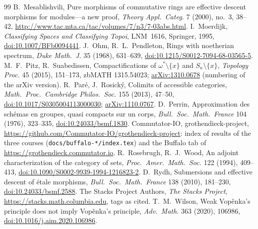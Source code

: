 \documentclass[11pt,a4paper]{amsart}
\theoremstyle{definition}
\theoremstyle{remark}
\begin{document}
\begin{thebibliography}{99}
 B.~Mesablishvili, Pure morphisms of commutative rings are effective descent morphisms for modules---a new proof, \emph{Theory Appl.\ Categ.} 7 (2000), no.~3, 38--42, \url{http://www.tac.mta.ca/tac/volumes/7/n3/7-03abs.html}.
 I.~Moerdijk, \emph{Classifying Spaces and Classifying Topoi}, LNM~1616, Springer, 1995, \href{https://doi.org/10.1007/BFb0094441}{doi:10.1007/BFb0094441}.
 J.~Ohm, R.~L.~Pendleton, Rings with noetherian spectrum, \emph{Duke Math.\ J.} 35 (1968), 631--639, \href{https://doi.org/10.1215/S0012-7094-68-03565-5}{doi:10.1215/S0012-7094-68-03565-5}.
 M.~F.~Pitz, R.~Suabedissen, Compactifications of $\omega^*\setminus\{x\}$ and $S_\kappa\setminus\{x\}$, \emph{Topology Proc.} 45 (2015), 151--173, zbMATH 1315.54023; \href{https://arxiv.org/abs/1310.0678}{arXiv:1310.0678} (numbering of the arXiv version).
 R.~Paré, J.~Rosický, Colimits of accessible categories, \emph{Math.\ Proc.\ Cambridge Philos.\ Soc.} 155 (2013), 47--50, \href{https://doi.org/10.1017/S0305004113000030}{doi:10.1017/S0305004113000030}; \href{https://arxiv.org/abs/1110.0767}{arXiv:1110.0767}.
 D.~Perrin, Approximation des schémas en groupes, quasi compacts sur un corps, \emph{Bull.\ Soc.\ Math.\ France} 104 (1976), 323--335, \href{https://doi.org/10.24033/bsmf.1830}{doi:10.24033/bsmf.1830}.
 Commutator-IO, grothendieck-project, \url{https://github.com/Commutator-IO/grothendieck-project}: index of results of the three courses (\texttt{docs/buffalo-*/index.tex}) and the Buffalo tab of \url{https://grothendieck.commutator.io}.
 R.~Rosebrugh, R.~J.~Wood, An adjoint characterization of the category of sets, \emph{Proc.\ Amer.\ Math.\ Soc.} 122 (1994), 409--413, \href{https://doi.org/10.1090/S0002-9939-1994-1216823-2}{doi:10.1090/S0002-9939-1994-1216823-2}.
 D.~Rydh, Submersions and effective descent of étale morphisms, \emph{Bull.\ Soc.\ Math.\ France} 138 (2010), 181--230, \href{https://doi.org/10.24033/bsmf.2588}{doi:10.24033/bsmf.2588}.
 The Stacks Project Authors, \emph{The Stacks Project}, \url{https://stacks.math.columbia.edu}, tags as cited.
 T.~M.~Wilson, Weak Vop\v{e}nka's principle does not imply Vop\v{e}nka's principle, \emph{Adv.\ Math.} 363 (2020), 106986, \href{https://doi.org/10.1016/j.aim.2020.106986}{doi:10.1016/j.aim.2020.106986}.
\end{thebibliography}
\end{document}
